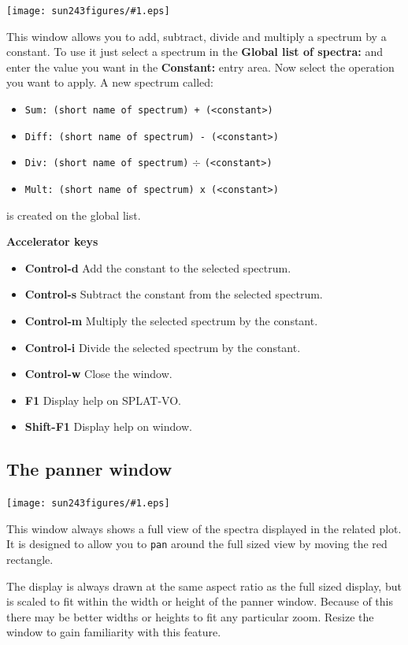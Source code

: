 \documentclass[twoside,11pt]{article}
\newcommand{\htmladdimg}[1]{}
\newcommand{\latexhtml}[2]{#1}
\renewcommand{\_}{\texttt{\symbol{95}}}
\newcommand{\SPLAT}{\textsf{SPLAT-VO}}
\newcommand{\mainfigure}[1]
{\begin{center}
 \latexhtml{\texttt{[image: sun243\_figures/\#1.eps]}}{\htmladdimg{#1.gif}}
 \end{center}
}
\newcommand{\labelitem}[1]{\textbf{#1}}
\newcommand{\hitext}[1]{\texttt{#1}}
\newcommand{\subheading}[1]{\textbf{\large{#1}}}
\begin{document}
\mainfigure{unarymathwindow}

This window allows you to add, subtract, divide and multiply a
spectrum by a constant. To use it just select a spectrum in the
\labelitem{Global list of spectra:} and enter the value you want in
the \labelitem{Constant:} entry area.
Now select the operation you want to apply. A new spectrum called:
\begin{itemize}
  \item \hitext{Sum: (short name of spectrum) + (<constant>)}
  \item \hitext{Diff: (short name of spectrum) - (<constant>)}
  \item \hitext{Div: (short name of spectrum)} $\div$ \hitext{(<constant>)}
  \item \hitext{Mult: (short name of spectrum) x (<constant>)}
\end{itemize}
is created on the global list.

\subheading{Accelerator keys}

\begin{itemize}
\item \labelitem{Control-d} Add the constant to the selected spectrum.
\item \labelitem{Control-s} Subtract the constant from the selected spectrum.
\item \labelitem{Control-m} Multiply the selected spectrum by the constant.
\item \labelitem{Control-i} Divide the selected spectrum by the constant.
\item \labelitem{Control-w} Close the window.
\item \labelitem{F1} Display help on \SPLAT.     
\item \labelitem{Shift-F1} Display help on window.
\end{itemize}

\newpage
\subsection{The panner window}

\mainfigure{pannerwindow}

This window always shows a full view of the spectra displayed in
the related plot. It is designed to allow you to \hitext{pan} around
the full sized view by moving the red rectangle.

The display is always drawn at the same aspect ratio as the full sized
display, but is scaled to fit within the width or height of the panner
window. Because of this there may be better widths or heights to fit
any particular zoom. Resize the window to gain familiarity with this
feature.
\end{document}
